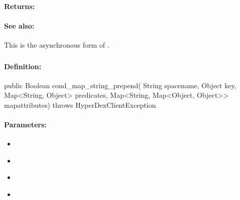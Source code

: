 \paragraph{Returns:}


\paragraph{See also:}  This is the asynchronous form of .

\pagebreak
\subsubsection{}
\label{api:java:cond_map_string_prepend}


\paragraph{Definition:}
\begin{javacode}
public Boolean cond_map_string_prepend(
        String spacename,
        Object key,
        Map<String, Object> predicates,
        Map<String, Map<Object, Object>> mapattributes) throws HyperDexClientException
\end{javacode}

\paragraph{Parameters:}
\begin{itemize}[noitemsep]
\item {}\\

\item {}\\

\item {}\\

\item {}\\

\end{itemize}

